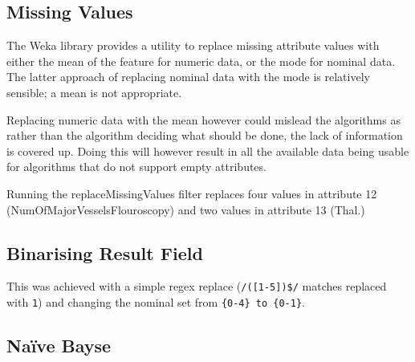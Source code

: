 \documentclass[10pt]{article}
\begin{document}
    \subsection{Missing Values}
      The Weka library provides a utility to replace missing attribute values with either the mean of the feature for numeric data, or the mode for nominal data. The latter approach of replacing nominal data with the mode is relatively sensible; a mean is not appropriate.

      Replacing numeric data with the mean however could mislead the algorithms as rather than the algorithm deciding what should be done, the lack of information is covered up. Doing this will however result in all the available data being usable for algorithms that do not support empty attributes.

      Running the replaceMissingValues filter replaces four values in attribute 12 (NumOfMajorVesselsFlouroscopy) and two values in attribute 13 (Thal.)\\

    \subsection{Binarising Result Field}
      This was achieved with a simple regex replace (\texttt{/([1-5])\$/} matches replaced with \texttt{1}) and changing the nominal set from \texttt{\{0-4\} to \{0-1\}}.

    \subsection{Naïve Bayse}

\end{document}
